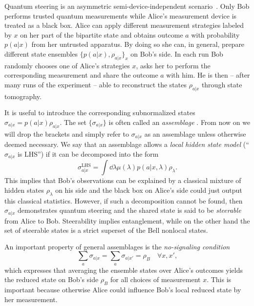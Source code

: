 \documentclass[aps,pra,twocolumn,superscriptaddress,showemail,showpacs,longbibliography]{revtex4-2}
\begin{document}
Quantum steering is an asymmetric semi-device-independent scenario~\cite{wisemanSteeringEntanglementNonlocality2007, jonesEntanglementEinsteinPodolskyRosenCorrelations2007}. Only Bob performs trusted quantum measurements while Alice's measurement device is treated as a black box. Alice can apply different measurement strategies labeled by $x$ on her part of the bipartite state and obtains outcome $a$ with probability $p(a|x)$ from her untrusted apparatus. By doing so she can, in general, prepare different state ensembles $\{p(a|x), \rho_{a|x}\}_x$ on Bob's side. In each run Bob randomly chooses one of Alice's strategies $x$, asks her to perform the corresponding measurement and share the outcome $a$ with him. He is then -- after many runs of the experiment -- able to reconstruct the states $\rho_{a|x}$ through state tomography. 

It is useful to introduce the corresponding subnormalized states $\sigma_{a|x}=p(a|x)\rho_{a|x}$. The set $\{\sigma_{a|x}\}$ is often called an \emph{assemblage} \cite{cavalcantiQuantumSteeringReview2017}. From now on we will drop the brackets and simply refer to $\sigma_{a|x}$ as an assemblage unless otherwise deemed necessary. We say that an assemblage allows a \emph{local hidden state model} (``$\sigma_{a|x}$ is LHS'') if it can be decomposed into the form \cite{cavalcantiQuantumSteeringReview2017}
\begin{equation}
    \label{eq:LHS_decomposition}
    \sigma^\text{LHS}_{a|x} = \int \dd{\lambda} \mu(\lambda) p(a|x,\lambda) \rho_\lambda.
\end{equation}
This implies that Bob's observations can be explained by a classical mixture of hidden states $\rho_\lambda$ on his side and the black box on Alice's side could just output this classical statistics. However, if such a decomposition cannot be found, then $\sigma_{a|x}$ demonstrates quantum steering and the shared state is said to be \emph{steerable} from Alice to Bob. Steerability implies entanglement, while on the other hand the set of steerable states is a strict superset of the Bell nonlocal states. 

An important property of general assemblages is the \emph{no-signaling condition}
\begin{equation}
    \label{eq:no-signaling}
    \sum_a \sigma_{a|x} = \sum_a \sigma_{a|x'} = \rho_B \quad \forall x, x',
\end{equation}
which expresses that averaging the ensemble states over Alice's outcomes yields the reduced state on Bob's side $\rho_B$ for all choices of measurement $x$. This is important because otherwise Alice could influence Bob's local reduced state by her measurement.
\end{document}
